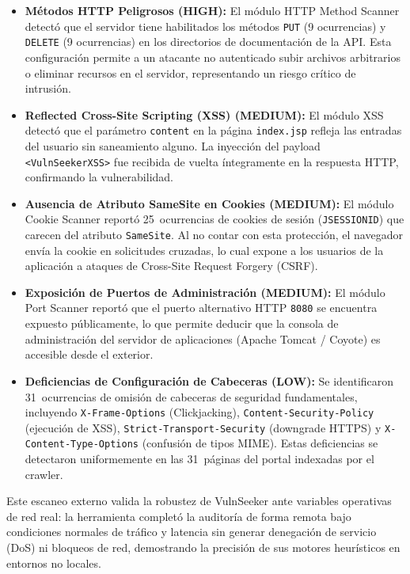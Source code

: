 \documentclass[12pt, a4paper]{article}
\begin{document}
\begin{itemize}
    \item \textbf{Métodos HTTP Peligrosos (HIGH):} El módulo HTTP Method Scanner
    detectó que el servidor tiene habilitados los métodos \texttt{PUT} (9 ocurrencias)
    y \texttt{DELETE} (9 ocurrencias) en los directorios de documentación de la API. Esta
    configuración permite a un atacante no autenticado subir archivos arbitrarios o eliminar
    recursos en el servidor, representando un riesgo crítico de intrusión.
    
    \item \textbf{Reflected Cross-Site Scripting (XSS) (MEDIUM):} El módulo XSS detectó
    que el parámetro \texttt{content} en la página \texttt{index.jsp} refleja las entradas
    del usuario sin saneamiento alguno. La inyección del payload \texttt{<VulnSeekerXSS>} fue
    recibida de vuelta íntegramente en la respuesta HTTP, confirmando la vulnerabilidad.

    \item \textbf{Ausencia de Atributo SameSite en Cookies (MEDIUM):} El módulo Cookie
    Scanner reportó 25~ocurrencias de cookies de sesión (\texttt{JSESSIONID}) que carecen del
    atributo \texttt{SameSite}. Al no contar con esta protección, el navegador envía la cookie en
    solicitudes cruzadas, lo cual expone a los usuarios de la aplicación a ataques de
    Cross-Site Request Forgery (CSRF).

    \item \textbf{Exposición de Puertos de Administración (MEDIUM):} El módulo Port Scanner
    reportó que el puerto alternativo HTTP \texttt{8080} se encuentra expuesto públicamente,
    lo que permite deducir que la consola de administración del servidor de aplicaciones
    (Apache Tomcat / Coyote) es accesible desde el exterior.

    \item \textbf{Deficiencias de Configuración de Cabeceras (LOW):} Se identificaron
    31~ocurrencias de omisión de cabeceras de seguridad fundamentales, incluyendo
    \texttt{X-Frame-Options} (Clickjacking), \texttt{Content-Security-Policy} (ejecución de XSS),
    \texttt{Strict-Transport-Security} (downgrade HTTPS) y \texttt{X-Content-Type-Options}
    (confusión de tipos MIME). Estas deficiencias se detectaron uniformemente en las
    31~páginas del portal indexadas por el crawler.
\end{itemize}

Este escaneo externo valida la robustez de VulnSeeker ante variables operativas de red real: la herramienta
completó la auditoría de forma remota bajo condiciones normales de tráfico y latencia
sin generar denegación de servicio (DoS) ni bloqueos de red, demostrando la precisión de sus
motores heurísticos en entornos no locales.
\end{document}
